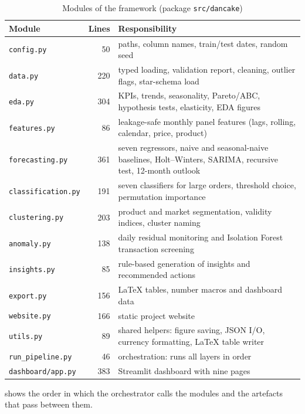 \begin{table}[htbp]\centering\small
\caption{Modules of the framework (package \texttt{src/dancake})}\label{tab:modules}
\begin{tabularx}{\linewidth}{@{}lrX@{}}
\toprule
\textbf{Module} & \textbf{Lines} & \textbf{Responsibility} \\ \midrule
\texttt{config.py} & 50 & paths, column names, train/test dates, random seed \\
\texttt{data.py} & 220 & typed loading, validation report, cleaning, outlier flags, star-schema load \\
\texttt{eda.py} & 304 & KPIs, trends, seasonality, Pareto/ABC, hypothesis tests, elasticity, EDA figures \\
\texttt{features.py} & 86 & leakage-safe monthly panel features (lags, rolling, calendar, price, product) \\
\texttt{forecasting.py} & 361 & seven regressors, naive and seasonal-naive baselines, Holt--Winters, SARIMA, recursive test, 12-month outlook \\
\texttt{classification.py} & 191 & seven classifiers for large orders, threshold choice, permutation importance \\
\texttt{clustering.py} & 203 & product and market segmentation, validity indices, cluster naming \\
\texttt{anomaly.py} & 138 & daily residual monitoring and Isolation Forest transaction screening \\
\texttt{insights.py} & 85 & rule-based generation of insights and recommended actions \\
\texttt{export.py} & 156 & \LaTeX{} tables, number macros and dashboard data \\
\texttt{website.py} & 166 & static project website \\
\texttt{utils.py} & 89 & shared helpers: figure saving, JSON I/O, currency formatting, \LaTeX{} table writer \\
\texttt{run\_pipeline.py} & 46 & orchestration: runs all layers in order \\
\texttt{dashboard/app.py} & 383 & Streamlit dashboard with nine pages \\ \bottomrule
\end{tabularx}
\end{table}

 shows the order in which the orchestrator calls the modules and the artefacts that pass
between them.

